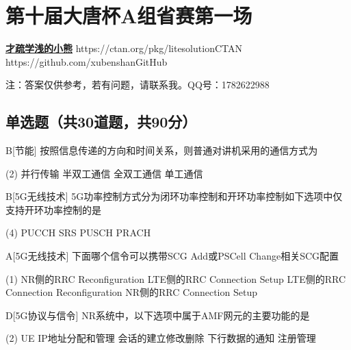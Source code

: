 \chapter{第十届大唐杯A组省赛第一场}
\fancyhead[R]{\color{H6}\kaishu\rightmark\,}

\date{2023年4月08日}{}{\href{https://qm.qq.com/q/UPbGudx8cK}{\textbf{才疏学浅的小熊}}}
{}
{https://ctan.org/pkg/litesolution}{CTAN}
{https://github.com/xubenshan}{GitHub}

注：答案仅供参考，若有问题，请联系我。QQ号：1782622988
\section{单选题（共30道题，共90分）}



\begin{choice}{B}[节能]
    按照信息传递的方向和时间关系，则普通对讲机采用的通信方式为
    \begin{tasks}(2)
        \task 并行传输
        \task 半双工通信
        \task 全双工通信
        \task 单工通信
    \end{tasks}
\end{choice}


\begin{choice}{B}[5G无线技术]
    5G功率控制方式分为闭环功率控制和开环功率控制如下选项中仅支持开环功率控制的是
    \begin{tasks}(4)
        \task PUCCH
        \task SRS
        \task PUSCH
        \task PRACH
    \end{tasks}
\end{choice}




\begin{choice}{A}[5G无线技术]
    下面哪个信令可以携带SCG Add或PSCell Change相关SCG配置
    \begin{tasks}(1)
        \task NR侧的RRC Reconfiguration
        \task LTE侧的RRC Connection Setup
        \task LTE侧的RRC Connection Reconfiguration
        \task NR侧的RRC Connection Setup
    \end{tasks}
\end{choice}


\begin{choice}{D}[5G协议与信令]
    NR系统中，以下选项中属于AMF网元的主要功能的是
    \begin{tasks}(2)
        \task UE IP地址分配和管理
        \task 会话的建立修改删除
        \task 下行数据的通知
        \task 注册管理
    \end{tasks}
\end{choice}

